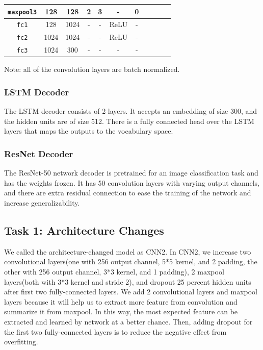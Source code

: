 \documentclass{article}
\begin{document}
\begin{table}[H]
\begin{tabular}{|c|c|c|c|c|c|c|c|c|c|c|}
            \hline
            \texttt{maxpool3} & 128            & 128             & 2           & 3           & -                   & 0            \\

            \hline
            \texttt{fc1}      & 128            & 1024            & -           & -           & ReLU                & -            \\

            \hline
            \texttt{fc2}      & 1024           & 1024            & -           & -           & ReLU                & -            \\

            \hline
            \texttt{fc3}      & 1024           & 300             & -           & -           & -                   & -            \\

            \hline
        \end{tabular}
    \end{table}

    Note: all of the convolution layers are batch normalized.

    \subsubsection{LSTM Decoder}
    The LSTM decoder consists of 2 layers.
    It accepts an embedding of size 300, and the hidden units are of size 512.
    There is a fully connected head over the LSTM layers that maps the outputs to the vocabulary space.

    \subsubsection{ResNet Decoder}
    The ResNet-50 network decoder is pretrained for an image classification task and has the weights frozen.
    It has 50 convolution layers with varying output channels, and there are extra residual connection to ease the training of the network and increase generalizability.

    \subsection{Task 1: Architecture Changes}
    We called the architecture-changed model as CNN2.
    In CNN2, we increase two convolutional layers(one with 256 output channel, 5*5 kernel, and 2 padding, the other with 256 output channel, 3*3 kernel, and 1 padding),
    2 maxpool layers(both with 3*3 kernel and stride 2), and dropout 25 percent hidden units after first two fully-connected layers.
    We add 2 convolutional layers and maxpool layers because it will help us to extract more feature from convolution and summarize it from maxpool.
    In this way, the most expected feature can be extracted and learned by network at a better chance.
    Then, adding dropout for the first two fully-connected layers is to reduce the negative effect from overfitting.
\end{document}
